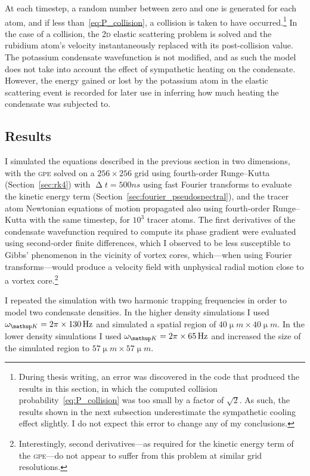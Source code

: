At each timestep, a random number between zero and one is generated for each atom, and if less than~\eqref{eq:P_collision}, a collision is taken to have occurred.\footnote{During thesis writing, an error was discovered in the code that produced the results in this section, in which the computed collision probability~\eqref{eq:P_collision} was too small by a factor of $\sqrt{2}$. As such, the results shown in the next subsection underestimate the sympathetic cooling effect slightly. I do not expect this error to change any of my conclusions.} In the case of a collision, the \textsc{2d} elastic scattering problem is solved and the rubidium atom's velocity instantaneously replaced with its post-collision value. The potassium condensate wavefunction is not modified, and as such the model does not take into account the effect of sympathetic heating on the condensate. However, the energy gained or lost by the potassium atom in the elastic scattering event is recorded for later use in inferring how much heating the condensate was subjected to.

\subsection{Results}

I simulated the equations described in the previous section in two dimensions, with the \textsc{gpe} solved on a $256\times256$ grid using fourth-order Runge--Kutta (Section~\ref{sec:rk4}) with $\upDelta t = 500\unit{ns}$ using fast Fourier transforms to evaluate the kinetic energy term (Section~\ref{sec:fourier_pseudospectral}), and the tracer atom Newtonian equations of motion propagated also using fourth-order Runge--Kutta with the same timestep, for $10^3$ tracer atoms. The first derivatives of the condensate wavefunction required to compute its phase gradient were evaluated using second-order finite differences, which I observed to be less susceptible to Gibbs' phenomenon in the vicinity of vortex cores, which---when using Fourier transforms---would produce a velocity field with unphysical radial motion close to a vortex core.\footnote{Interestingly, second derivatives---as required for the kinetic energy term of the \textsc{gpe}---do not appear to suffer from this problem at similar grid resolutions.}

I repeated the simulation with two harmonic trapping frequencies in order to model two condensate densities. In the higher density simulations I used $\omega_\up{K}=2\pi\times 130\unit{Hz}$ and simulated a spatial region of $40\unit{\upmu m}\times40\unit{\upmu m}$. In the lower density simulations I used $\omega_\up{K}=2\pi\times 65\unit{Hz}$ and increased the size of the simulated region to $57\unit{\upmu m}\times57\unit{\upmu m}$.

